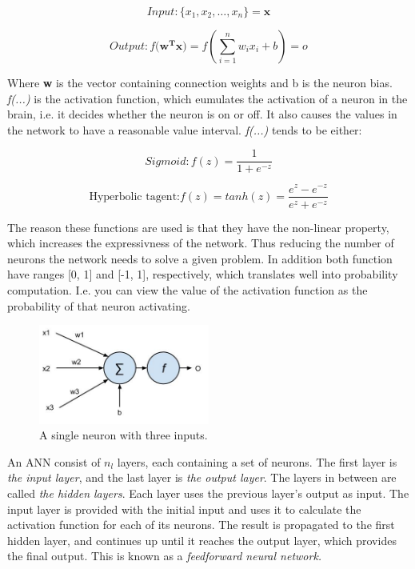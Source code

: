 \begin{equation}\label{eq_neuron_in}
Input: \{x_1, x_2,\dots, x_n\} = \mathbf{x} 
\end{equation}

\begin{equation}\label{eq_neuron_out}
Output: f(\mathbf{w^{T}x)} = f(\sum_{i=1}^{n}w_i x_i + b) = o
\end{equation}

Where \textbf{w} is the vector containing connection weights and b is the neuron bias. \textit{f(...)} is the activation function, which eumulates the activation of a neuron in the brain, i.e. it decides whether the neuron is on or off. It also causes the values in the network to have a reasonable value interval. \textit{f(...)} tends to be either:

\begin{equation}
Sigmoid: f(z) = \frac{1}{1 + e^{-z}}
\end{equation}



\begin{equation}
\text{Hyperbolic tagent:} f(z) = tanh(z) = \frac{e^z - e^{-z}}{e^z + e^{-z}}
\end{equation}

The reason these functions are used is that they have the non-linear property, which increases the expressivness of the network. Thus reducing the number of neurons the network needs to solve a given problem. In addition both function have ranges [0, 1] and [-1, 1], respectively, which translates well into probability computation. I.e. you can view the value of the activation function as the probability of that neuron activating.  
 

\begin{figure}[h!]
  \centering
      \includegraphics[width=0.5\textwidth, scale=0.1]{Figures/Background/Neuron}
  \caption{A single neuron with three inputs. }
  \label{fig_neuron}
\end{figure}

An ANN consist of $ n_l $ layers, each containing a set of neurons. The first layer is \textit{the input layer}, and the last layer is \textit{the output layer}. The layers in between are called \textit{the hidden layers}. Each layer uses the previous layer's output as input. The input layer is provided with the initial input and uses it to calculate the activation function for each of its neurons. The result is propagated to the first hidden layer, and continues up until it reaches the output layer, which provides the final output. This is known as a \textit{feedforward neural network.}

